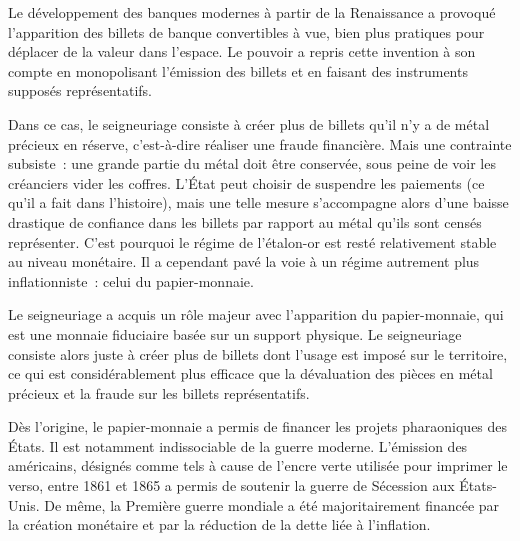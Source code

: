 
Le développement des banques modernes à partir de la Renaissance a provoqué l'apparition des billets de banque convertibles à vue, bien plus pratiques pour déplacer de la valeur dans l'espace. Le pouvoir a repris cette invention à son compte en monopolisant l'émission des billets et en faisant des instruments supposés représentatifs.

Dans ce cas, le seigneuriage consiste à créer plus de billets qu'il n'y a de métal précieux en réserve, c'est-à-dire réaliser une fraude financière. Mais une contrainte subsiste~: une grande partie du métal doit être conservée, sous peine de voir les créanciers vider les coffres. L'État peut choisir de suspendre les paiements (ce qu'il a fait dans l'histoire), mais une telle mesure s'accompagne alors d'une baisse drastique de confiance dans les billets par rapport au métal qu'ils sont censés représenter. C'est pourquoi le régime de l'étalon-or est resté relativement stable au niveau monétaire. Il a cependant pavé la voie à un régime autrement plus inflationniste~: celui du papier-monnaie.


Le seigneuriage a acquis un rôle majeur avec l'apparition du papier-monnaie, qui est une monnaie fiduciaire basée sur un support physique. Le seigneuriage consiste alors juste à créer plus de billets dont l'usage est imposé sur le territoire, ce qui est considérablement plus efficace que la dévaluation des pièces en métal précieux et la fraude sur les billets représentatifs.


Dès l'origine, le papier-monnaie a permis de financer les projets pharaoniques des États. Il est notamment indissociable de la guerre moderne. L'émission des  américains, désignés comme tels à cause de l'encre verte utilisée pour imprimer le verso, entre 1861 et 1865 a permis de soutenir la guerre de Sécession aux États-Unis. De même, la Première guerre mondiale a été majoritairement financée par la création monétaire et par la réduction de la dette liée à l'inflation.

